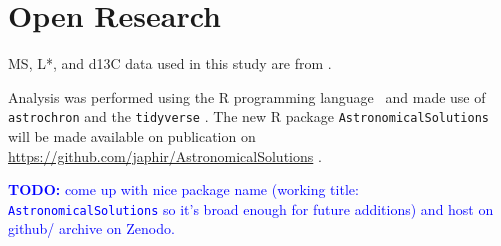 \documentclass[draft]{agujournal2019}
\newcommand{\ijk}{\textcolor{blue}}
\begin{document}


%
%

%

%



\section*{Open Research}

\Gls{MS}, \gls{L*}, and \gls{d13C} data used in this study are from .

Analysis was performed using the R programming language~\cite{RCoreTeam2020} and made use of \texttt{astrochron}  and the \texttt{tidyverse} .
The new R package \texttt{AstronomicalSolutions} will be made available on publication on \url{https://github.com/japhir/AstronomicalSolutions} .

\ijk{\textbf{TODO:} come up with nice package name (working title: \texttt{AstronomicalSolutions} so it's broad enough for future additions) and host on github/ archive on Zenodo.}
\end{document}

